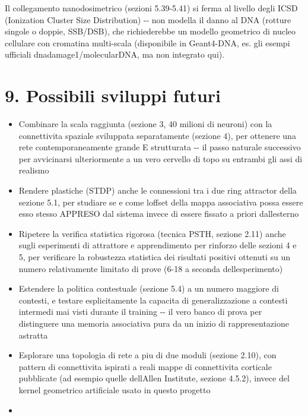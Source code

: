 \documentclass[
  italian,
]{article}
\begin{document}
Il collegamento nanodosimetrico (sezioni 5.39-5.41) si ferma al livello degli ICSD (Ionization Cluster Size Distribution) -\/- non modella il danno al DNA (rotture singole o doppie, SSB/DSB), che richiederebbe un modello geometrico di nucleo cellulare con cromatina multi-scala (disponibile in Geant4-DNA, es. gli esempi ufficiali dnadamage1/molecularDNA, ma non integrato qui).

\section{9. Possibili sviluppi futuri}\label{possibili-sviluppi-futuri}

\begin{itemize}
\item
  Combinare la scala raggiunta (sezione 3, 40 milioni di neuroni) con la connettivita\textquotesingle{} spaziale sviluppata separatamente (sezione 4), per ottenere una rete contemporaneamente grande E strutturata -\/- il passo naturale successivo per avvicinarsi ulteriormente a un vero cervello di topo su entrambi gli assi di realismo
\item
  Rendere plastiche (STDP) anche le connessioni tra i due ring attractor della sezione 5.1, per studiare se e come l\textquotesingle offset della mappa associativa possa essere esso stesso APPRESO dal sistema invece di essere fissato a priori dall\textquotesingle esterno
\item
  Ripetere la verifica statistica rigorosa (tecnica PSTH, sezione 2.11) anche sugli esperimenti di attrattore e apprendimento per rinforzo delle sezioni 4 e 5, per verificare la robustezza statistica dei risultati positivi ottenuti su un numero relativamente limitato di prove (6-18 a seconda dell\textquotesingle esperimento)
\item
  Estendere la politica contestuale (sezione 5.4) a un numero maggiore di contesti, e testare esplicitamente la capacita\textquotesingle{} di generalizzazione a contesti intermedi mai visti durante il training -\/- il vero banco di prova per distinguere una memoria associativa pura da un inizio di rappresentazione astratta
\item
  Esplorare una topologia di rete a piu\textquotesingle{} di due moduli (sezione 2.10), con pattern di connettivita\textquotesingle{} ispirati a reali mappe di connettivita\textquotesingle{} corticale pubblicate (ad esempio quelle dell\textquotesingle Allen Institute, sezione 4.5.2), invece del kernel geometrico artificiale usato in questo progetto
\item

\end{itemize}
\end{document}
